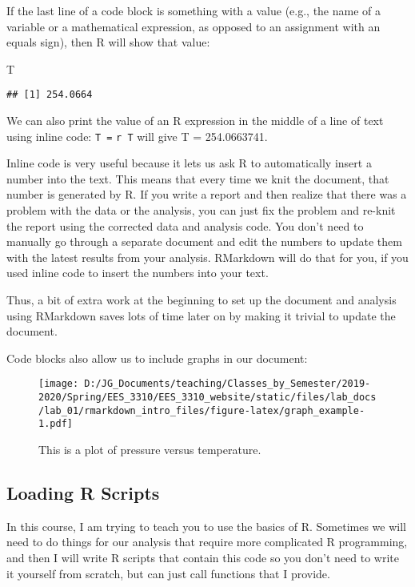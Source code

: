 \documentclass[
]{article}
\newenvironment{Shaded}{\begin{snugshade}}{\end{snugshade}}
\newcommand{\NormalTok}[1]{#1}
\begin{document}
If the last line of a code block is something with a value (e.g., the
name of a variable or a mathematical expression, as opposed to an
assignment with an equals sign), then R will show that value:

\begin{Shaded}
\begin{Highlighting}[]
\NormalTok{T}
\end{Highlighting}
\end{Shaded}

\begin{verbatim}
## [1] 254.0664
\end{verbatim}

We can also print the value of an R expression in the middle of a line
of text using inline code: \texttt{T\ =}
\texttt{\textasciigrave{}r\ T\textasciigrave{}} will give T =
254.0663741.

Inline code is very useful because it lets us ask R to automatically
insert a number into the text. This means that every time we knit the
document, that number is generated by R. If you write a report and then
realize that there was a problem with the data or the analysis, you can
just fix the problem and re-knit the report using the corrected data and
analysis code. You don't need to manually go through a separate document
and edit the numbers to update them with the latest results from your
analysis. RMarkdown will do that for you, if you used inline code to
insert the numbers into your text.

Thus, a bit of extra work at the beginning to set up the document and
analysis using RMarkdown saves lots of time later on by making it
trivial to update the document.

Code blocks also allow us to include graphs in our document:

\begin{figure}
\centering
\texttt{[image: D:/JG\_Documents/teaching/Classes\_by\_Semester/2019-2020/Spring/EES\_3310/EES\_3310\_website/static/files/lab\_docs/lab\_01/rmarkdown\_intro\_files/figure-latex/graph\_example-1.pdf]}
\caption{This is a plot of pressure versus temperature.}
\end{figure}

\hypertarget{loading-r-scripts}{%
\subsection{Loading R Scripts}\label{loading-r-scripts}}

In this course, I am trying to teach you to use the basics of R.
Sometimes we will need to do things for our analysis that require more
complicated R programming, and then I will write R scripts that contain
this code so you don't need to write it yourself from scratch, but can
just call functions that I provide.
\end{document}
